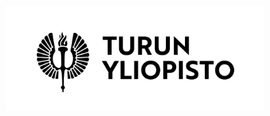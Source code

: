 
\usepackage{geometry}




\theoremstyle{plain}
\newtheorem{theorem}{Lause}
\newtheorem{lemma}{Lemma}
\newtheorem{corollary}{Seuraus}
%
\theoremstyle{definition}
\newtheorem{definition}{M\"a\"aritelm\"a}
\newtheorem{example}{Esimerkki}
%
\theoremstyle{remark}
\newtheorem{remark}{Huomautus}


\newcommand{\tekija}{{Ewert Kupiainen}} %
\newcommand{\titteli}{{LuK }} %
\newcommand{\otsikko}{{Gradun otsikko}}   %
\newcommand{\tutkielma}{{Pro gradu }}   %
\newcommand{\aika}{{Kesäkuu 2020}}   %
\newcommand{\paaaine}{{Matematiikka}} %
\newcommand{\ohjaaja}{{Prof. H. H.}} %
\newcommand{\tarkastaja}{{Dos. D.D. }} %



\pagestyle{empty}  %

\begin{center}
\includegraphics[width=10cm]{UTU_logo_FI} %
\end{center}

